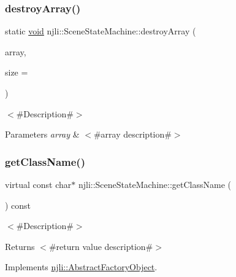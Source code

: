 \subsubsection{\texorpdfstring{destroy\+Array()}{destroyArray()}}
{\footnotesize\ttfamily static \mbox{\hyperlink{_thread_8h_af1e856da2e658414cb2456cb6f7ebc66}{void}} njli\+::\+Scene\+State\+Machine\+::destroy\+Array (\begin{DoxyParamCaption}\item[{\mbox{\hyperlink{classnjli_1_1_scene_state_machine}{Scene\+State\+Machine}} $\ast$$\ast$}]{array,  }\item[{const \mbox{\hyperlink{_util_8h_a10e94b422ef0c20dcdec20d31a1f5049}{u32}}}]{size = {} }\end{DoxyParamCaption})\hspace{0.3cm}{\ttfamily [static]}}

$<$\#\+Description\#$>$


\begin{DoxyParams}{Parameters}
{\em array} & $<$\#array description\#$>$ \\
\hline
\end{DoxyParams}
\mbox{\label{classnjli_1_1_scene_state_machine_a5a3f221a1b765b690d2cfd45e8a5e574}} 
\subsubsection{\texorpdfstring{get\+Class\+Name()}{getClassName()}}
{\footnotesize\ttfamily virtual const char$\ast$ njli\+::\+Scene\+State\+Machine\+::get\+Class\+Name (\begin{DoxyParamCaption}{ }\end{DoxyParamCaption}) const\hspace{0.3cm}{\ttfamily [virtual]}}

$<$\#\+Description\#$>$

\begin{DoxyReturn}{Returns}
$<$\#return value description\#$>$ 
\end{DoxyReturn}


Implements \mbox{\hyperlink{classnjli_1_1_abstract_factory_object_af4151e41b80d5bc3fc42822c67fc2278}{njli\+::\+Abstract\+Factory\+Object}}.

